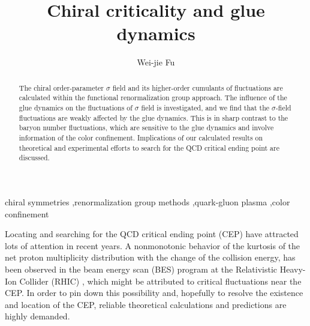 \documentclass[final,5p,times,twocolumn,colorlinks=true,citecolor=blue,linkcolor=blue]{elsarticle}
\begin{document}
\title{Chiral criticality and glue dynamics}

\author[ad:DUT]{Wei-jie Fu}

\address[ad:DUT]{School of Physics, Dalian University of Technology, Dalian, 116024,
  P.R. China}


\begin{abstract}

The chiral order-parameter $\sigma$ field and its higher-order cumulants of fluctuations are calculated within the functional renormalization group approach. The influence of the glue dynamics on the fluctuations of $\sigma$ field is investigated, and we find that the $\sigma$-field fluctuations are weakly affected by the glue dynamics. This is in sharp contrast to the baryon number fluctuations, which are sensitive to the glue dynamics and involve information of the color confinement. Implications of our calculated results on theoretical and experimental efforts to search for the QCD critical ending point are discussed.

\end{abstract}

\begin{keyword}
chiral symmetries \sep renormalization group methods \sep quark-gluon plasma \sep  color confinement 
\end{keyword}

\maketitle


Locating and searching for the QCD critical ending point (CEP) have attracted lots of attention in recent years. A nonmonotonic behavior of the kurtosis of the net proton multiplicity distribution with the change of the collision energy, has been observed in the beam energy scan (BES) program at the Relativistic Heavy-Ion Collider (RHIC) \cite{Adamczyk:2013dal,Luo:2015ewa,Luo:2017faz}, which might be attributed to critical fluctuations near the CEP. In order to pin down this possibility and, hopefully to resolve the existence and location of the CEP, reliable theoretical calculations and predictions are highly demanded.
\end{document}
